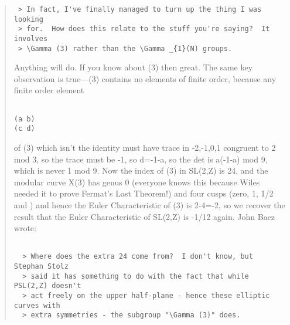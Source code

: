 \begin{quote}
\begin{verbatim}
 > In fact, I've finally managed to turn up the thing I was looking
 > for.  How does this relate to the stuff you're saying?  It involves
 > \Gamma (3) rather than the \Gamma _{1}(N) groups.
\end{verbatim}
    
 Anything will do. If you know about \Gamma (3) then great. The same
 key observation is true---\Gamma (3) contains no elements of finite
 order, because any finite order element 

\begin{verbatim}

(a b)
(c d)
\end{verbatim}
    
 of \Gamma (3) which isn't
 the identity must have trace in {-2,-1,0,1} congruent to 2 mod 3,
 so the trace must be -1, so d=-1-a, so the det is a(-1-a) mod 9,
 which is never 1 mod 9. Now the index of \Gamma (3) in SL(2,Z) is 24,
 and the modular curve X(3) has genus 0 (everyone knows this because Wiles
 needed it to prove Fermat's Last Theorem!) and four cusps (zero, 1, 1/2
 and \infty ) and hence the Euler Characteristic of \Gamma (3) is 2-4=-2, so
 we recover the result that the Euler Characteristic of SL(2,Z) is -1/12 again.
 John Baez wrote:

\begin{verbatim}

  > Where does the extra 24 come from?  I don't know, but Stephan Stolz
  > said it has something to do with the fact that while PSL(2,Z) doesn't
  > act freely on the upper half-plane - hence these elliptic curves with
  > extra symmetries - the subgroup "\Gamma (3)" does.
\end{verbatim}
    

\end{quote}
